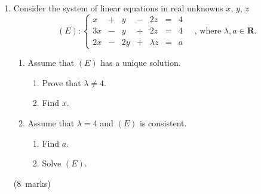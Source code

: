 \documentclass[12pt, a4paper]{article} %
\newcommand{\qmarks}[1]{\leavevmode\unskip\hspace*{\fill}\mbox{(#1 marks)}}
\begin{document}
\begin{enumerate}
    \item Consider the system of linear equations in real unknowns \(x\), \(y\), \(z\)
    \[
        (E): \left\{
        \begin{array}{ccccccc}
             x &  + & y  & - & 2z  & = & 4 \\
            3x & - & y & + & 2z & = & 4\\
            2x & -  & 2y  & + & \lambda z  & = & a
        \end{array}
        \right.
        \quad \text{, where } \lambda, a \in \mathbf{R}.
    \]
    \begin{enumerate}
        \item Assume that \((E)\) has a unique solution.
        \begin{enumerate}[label=(\roman*)]
            \item Prove that \(\lambda \neq 4\).
            \item Find \(x\).
        \end{enumerate}
        \item Assume that \(\lambda=4\) and \((E)\) is consistent.
        \begin{enumerate}[label=(\roman*)]
            \item Find \(a\).
            \item Solve \((E)\).
        \end{enumerate}
    \end{enumerate} \qmarks{8}
\end{enumerate}

\newpage
\end{document}
